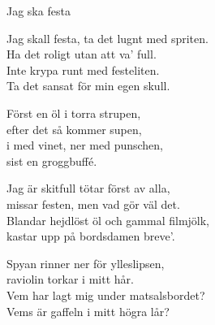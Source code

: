 \begin{song}{Jag ska festa}
	

	
	Jag skall festa, ta det lugnt med spriten.\\
	Ha det roligt utan att va' full.\\
	Inte krypa runt med festeliten.\\
	Ta det sansat för min egen skull.
	
	Först en öl i torra strupen,\\
	efter det så kommer supen,\\
	i med vinet, ner med punschen,\\
	sist en groggbuffé.
	
	Jag är skitfull tötar först av alla,\\
	missar festen, men vad gör väl det.\\
	Blandar hejdlöst öl och gammal filmjölk,\\
	kastar upp på bordsdamen breve'.
	
	Spyan rinner ner för ylleslipsen,\\
	raviolin torkar i mitt hår.\\
	Vem har lagt mig under matsalsbordet?\\
	Vems är gaffeln i mitt högra lår?

	
\end{song}

